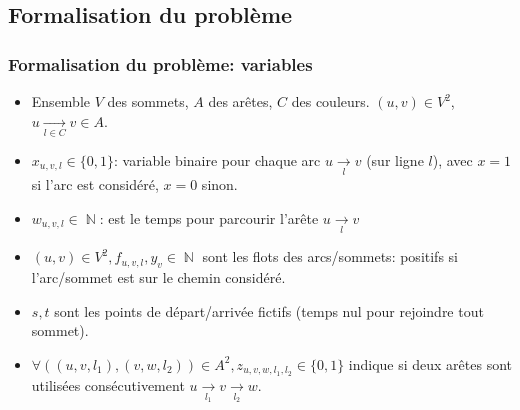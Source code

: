 \documentclass[10pt]{beamer}
\DeclareMathOperator{\NN}{\mathbb{N}}
\begin{document}
\begin{frame}
\end{frame}

\subsection{Formalisation du problème}

\begin{frame}
\frametitle{Formalisation du problème: variables}

\begin{itemize}
\item Ensemble $V$ des sommets, $A$ des arêtes, $C$ des couleurs.
$(u,v)\in V^2$, $u \xrightarrow[l\in C]{} v\in A$.

\item $x_{u,v,l}\in \lbrace 0,1 \rbrace$: variable binaire pour chaque arc $u \xrightarrow[l]{} v$ (sur ligne $l$), avec $x=1$ si l'arc est considéré, $x=0$ sinon.

\item $w_{u,v,l}\in \NN$: est le temps pour parcourir l'arête $u \xrightarrow[l]{} v$

\item $(u,v)\in V^2, f_{u,v,l}, y_v \in\NN$ sont les flots des arcs/sommets: positifs si l'arc/sommet est sur le chemin considéré.

\item $s, t$ sont les points de départ/arrivée fictifs (temps nul pour rejoindre tout sommet).
\item  $\forall ((u,v,l_1), (v,w,l_2)) \in A^2, z_{u,v,w,l_1,l_2} \in \lbrace 0,1 \rbrace$ indique si deux arêtes sont utilisées consécutivement $u \xrightarrow[l_1]{} v\xrightarrow[l_2]{} w$.
\end{itemize}
\end{frame}
\end{document}
